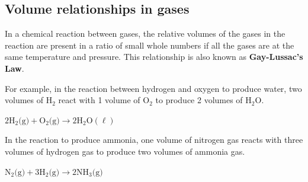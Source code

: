             \subsection*{Volume relationships in gases}
            \nopagebreak
      \label{m38711*id65179}In a chemical reaction between gases, the relative volumes of the gases in the reaction are present in a ratio of small whole numbers if all the gases are at the same temperature and pressure. This relationship is also known as \textbf{Gay-Lussac's Law}.\par 
      \label{m38711*id65189}For example, in the reaction between hydrogen and oxygen to produce water, two volumes of $\text{H}{}_{2}$ react with 1 volume of $\text{O}_{2}$ to produce 2 volumes of $\text{H}_{2}\text{O}$.\par 
      \label{m38711*id65237}$2\text{H}_{2}\text{(g)} +\text{O}_{2} \text{(g)} \to 2\text{H}_{2}\text{O} (\ell)$\par 
      \label{m38711*id65282}In the reaction to produce ammonia, one volume of nitrogen gas reacts with three volumes of hydrogen gas to produce two volumes of ammonia gas.\par 
      \label{m38711*id65286}$\text{N}_{2} \text{(g)}+3\text{H}_{2} \text{(g)} \to 2\text{NH}_{3} \text{(g)}$
      \par  
    \label{m38711*cid8}
            \nopagebreak
